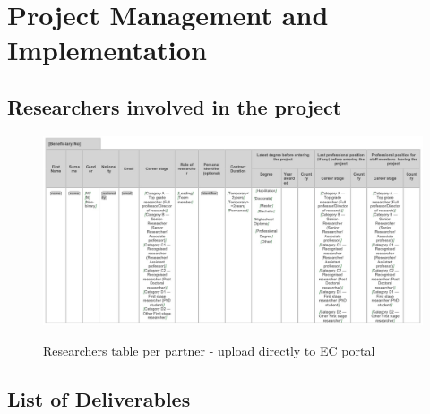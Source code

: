 
%
%


\section{Project Management and Implementation}
\subsection*{Researchers involved in the project}

\begin{figure}[h]
    \centering
    \caption{Researchers table per partner - upload directly to EC portal}
    \includegraphics[height=0.78\hsize]{graphics/researchers.jpg}
    \label{fig:enter-label}
\end{figure}
\newpage

\subsection*{List of Deliverables}

